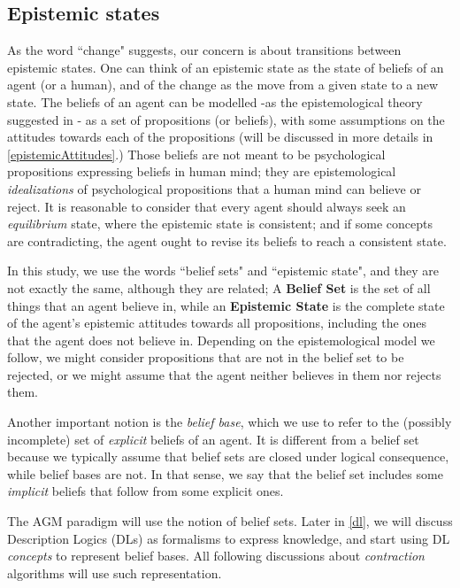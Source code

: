 \subsection{Epistemic states}
As the word ``change" suggests, our concern is about transitions between epistemic states. One can think of an epistemic state as the state of beliefs of an agent (or a human), and of the change as the move from a given state to a new state. The beliefs of an agent can be modelled -as the epistemological theory suggested in \cite{flux}- as a set of propositions (or beliefs), with some assumptions on the attitudes towards each of the propositions (will be discussed in more details in \ref{epistemicAttitudes}.) Those beliefs are not meant to be psychological propositions expressing beliefs in human mind; they are epistemological \textit{idealizations} of psychological propositions that a human mind can believe or reject. It is reasonable to consider that every agent should always seek an \textit{equilibrium} state, where the epistemic state is consistent; and if some concepts are contradicting, the agent ought to revise its beliefs to reach a consistent state. 

In this study, we use the words ``belief sets" and ``epistemic state", and they are not exactly the same, although they are related; A \textbf{Belief Set} is the set of all things that an agent believe in, while an \textbf{Epistemic State} is the complete state of the agent's epistemic attitudes towards all propositions, including the ones that the agent does not believe in. Depending on the epistemological model we follow, we might consider propositions that are not in the belief set to be rejected, or we might assume that the agent neither believes in them nor rejects them. 

Another important notion is the \textit{belief base}, which we use to refer to the (possibly incomplete) set of \textit{explicit} beliefs of an agent. It is different from a belief set because we typically assume that belief sets are closed under logical consequence, while belief bases are not. In that sense, we say that the belief set includes some \textit{implicit} beliefs that follow from some explicit ones.

The AGM paradigm will use the notion of belief sets. Later in \ref{dl}, we will discuss Description Logics (DLs) as formalisms to express knowledge, and start using DL \textit{concepts} to represent belief bases. All following discussions about \textit{contraction} algorithms will use such representation.



